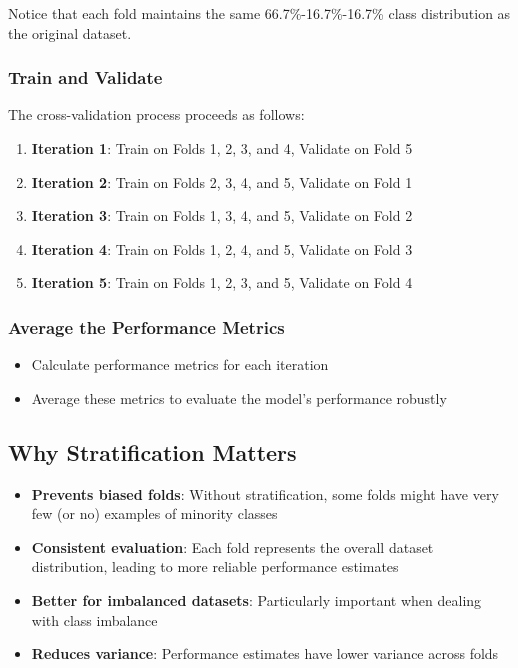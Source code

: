 \documentclass[11pt,a4paper]{article}
\theoremstyle{definition}
\theoremstyle{plain}
\theoremstyle{remark}
\begin{document}
Notice that each fold maintains the same 66.7\%-16.7\%-16.7\% class distribution as the original dataset.

\subsubsection{Train and Validate}

The cross-validation process proceeds as follows:

\begin{enumerate}
    \item \textbf{Iteration 1}: Train on Folds 1, 2, 3, and 4, Validate on Fold 5
    \item \textbf{Iteration 2}: Train on Folds 2, 3, 4, and 5, Validate on Fold 1
    \item \textbf{Iteration 3}: Train on Folds 1, 3, 4, and 5, Validate on Fold 2
    \item \textbf{Iteration 4}: Train on Folds 1, 2, 4, and 5, Validate on Fold 3
    \item \textbf{Iteration 5}: Train on Folds 1, 2, 3, and 5, Validate on Fold 4
\end{enumerate}

\subsubsection{Average the Performance Metrics}

\begin{itemize}
    \item Calculate performance metrics for each iteration
    \item Average these metrics to evaluate the model's performance robustly
\end{itemize}

\subsection{Why Stratification Matters}

\begin{itemize}
    \item \textbf{Prevents biased folds}: Without stratification, some folds might have very few (or no) examples of minority classes
    
    \item \textbf{Consistent evaluation}: Each fold represents the overall dataset distribution, leading to more reliable performance estimates
    
    \item \textbf{Better for imbalanced datasets}: Particularly important when dealing with class imbalance
    
    \item \textbf{Reduces variance}: Performance estimates have lower variance across folds
\end{itemize}
\end{document}
